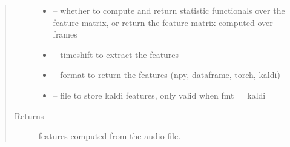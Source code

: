 \documentclass[letterpaper,10pt,english]{sphinxmanual}
\begin{document}
\begin{fulllineitems}
\begin{fulllineitems}
\begin{quote}
\begin{description}
\begin{itemize}
\item {} 
 -- whether to compute and return statistic functionals over the feature matrix, or return the feature matrix computed over frames

\item {} 
 -- timeshift to extract the features

\item {} 
 -- format to return the features (npy, dataframe, torch, kaldi)

\item {} 
 -- file to store kaldi features, only valid when fmt==\sphinxquotedblright{}kaldi\sphinxquotedblright{}

\end{itemize}

\item[{Returns}] \leavevmode
features computed from the audio file.

\end{description}\end{quote}


\end{fulllineitems}
\end{fulllineitems}
\end{document}

